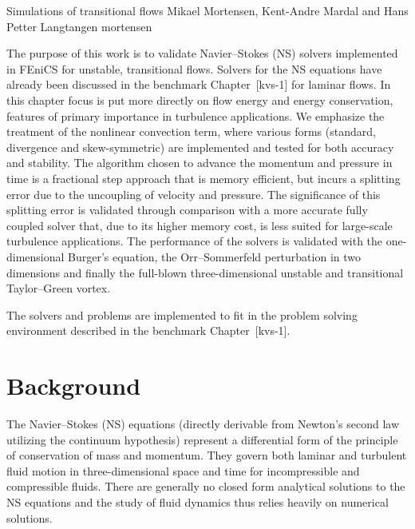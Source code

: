 
\renewcommand{\vec}[1]{\ensuremath{{ #1 \xspace}}}
\newcommand{\Nset}{\ensuremath{\mathbb{N}}\xspace}
\newcommand{\Zset}{\ensuremath{\mathbb{Z}}\xspace}
\newcommand{\Qset}{\ensuremath{\mathbb{Q}}\xspace}
\newcommand{\Cset}{\ensuremath{\mathbb{C}}\xspace}
\newcommand{\Hset}{\ensuremath{\mathbb{H}}\xspace}

              {Simulations of transitional flows}
              {Mikael Mortensen, Kent-Andre Mardal and Hans Petter Langtangen}
              {mortensen}

The purpose of this work is to validate Navier--Stokes (NS) solvers
implemented in FEniCS for unstable, transitional flows. Solvers for
the NS equations have already been discussed in the benchmark
Chapter~[kvs-1] for laminar flows. In this chapter focus is put more
directly on flow energy and energy conservation, features of primary
importance in turbulence applications. We emphasize the treatment of
the nonlinear convection term, where various forms (standard,
divergence and skew-symmetric) are implemented and tested for both
accuracy and stability. The algorithm chosen to advance the momentum
and pressure in time is a fractional step approach that is memory
efficient, but incurs a splitting error due to the uncoupling of
velocity and pressure. The significance of this splitting error is
validated through comparison with a more accurate fully coupled solver
that, due to its higher memory cost, is less suited for large-scale
turbulence applications. The performance of the solvers is validated
with the one-dimensional Burger's equation, the Orr--Sommerfeld
perturbation in two dimensions and finally the full-blown
three-dimensional unstable and transitional Taylor--Green vortex.

The solvers and problems are implemented to fit in the problem solving
environment described in the benchmark Chapter~[kvs-1].

\section{Background}

The Navier--Stokes (NS) equations (directly derivable from Newton's
second law utilizing the continuum hypothesis) represent a
differential form of the principle of conservation of mass and
momentum. They govern both laminar and turbulent fluid motion in
three-dimensional space and time for incompressible and compressible
fluids. There are generally no closed form analytical solutions to the
NS equations and the study of fluid dynamics thus relies heavily on
numerical solutions.

